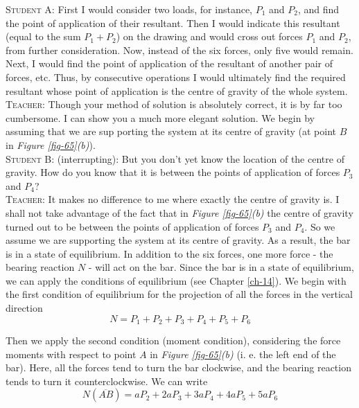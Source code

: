 \documentclass[a4paper,sfsidenotes]{tufte-book}
\begin{document}
\textsc{Student A:} First I would consider two loads, for instance,  $P_{1}$ and $P_{2}$, and find the point of application of their resultant. Then I would indicate this resultant (equal to the sum $P_{1} + P_{2}$) on the drawing and would cross out forces $P_{1}$ and $P_{2}$, from further consideration. Now, instead of the six forces, only five would remain. Next, I would find the point of application of the resultant of another pair of forces, etc. Thus, by consecutive operations I would ultimately find the required resultant whose point of application is the centre of gravity of the whole system.
\\
\textsc{Teacher:} Though your method of solution is absolutely correct, it is by far too cumbersome. I can show you a much more elegant solution. We begin by assuming that we are sup porting the system at its centre of gravity (at point $B$ in \emph{Figure \ref{fig-65}(b)}).
\\
\textsc{Student B:}  (interrupting): But you don't yet know the location of the centre of gravity. How do you know that it is between the points of application of forces $P_{3}$ and $P_{4}$?
\\
\textsc{Teacher:} It makes no difference to me where exactly the centre of gravity is. I shall not take advantage of the fact that in \emph{Figure \ref{fig-65}(b)} the centre of gravity turned out to be between the points of application of forces $P_{3}$ and $P_{4}$. So we assume we are supporting the system at its centre of gravity. As a result, the bar is in a state of equilibrium. In addition to the six forces, one more force - the bearing reaction $N$ - will act on the bar. Since the bar is in a state of equilibrium,
we can apply the conditions of equilibrium (see  Chapter \ref{ch-14}). We begin with the first condition of equilibrium for the projection of all the forces in the vertical direction
\begin{equation}%
N=P_{1}+P_{2}+P_{3}+P_{4}+P_{5}+P_{6}
\label{eq-86}
\end{equation}

Then we apply the second condition (moment condition), considering the force moments with respect to point $A$ in \emph{Figure \ref{fig-65}(b)} (i. e. the left end of the bar). Here, all the forces tend to turn the bar clockwise, and the bearing reaction tends to turn it counterclockwise. We can write
\begin{equation}%
N (\overline{AB}) = aP_{2} + 2aP_{3} + 3aP_{4} + 4aP_{5} + 5aP_{6}
\label{eq-87}
\end{equation}
\end{document}
